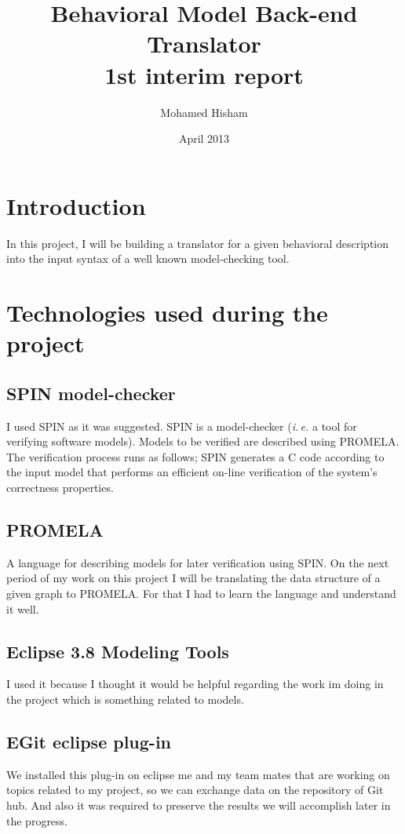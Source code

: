 \documentclass{article}
\title{Behavioral Model Back-end Translator\\ {\smaller 1st interim report}}
\author{Mohamed Hisham}
\date{April 2013}
\begin{document}
\maketitle

\newpage

\tableofcontents

\newpage

\section{Introduction}
In this project, I will be building a translator for a given behavioral description  into the input syntax of a well known model-checking tool. 

\section{Technologies used during the project}

\subsection{SPIN model-checker}
I used SPIN as it was suggested. SPIN is a model-checker (\emph{i.\,e.} a tool for verifying software models). Models to be verified are described using PROMELA. The verification process runs as follows; SPIN generates a C code according to the input model that performs an efficient on-line verification of the system’s correctness properties.

\subsection{PROMELA}
A language for describing models for later verification using SPIN. On the next period of my work on this project I will be translating the data structure of a given graph to PROMELA. For that I had to learn the language and understand it well.

\subsection{Eclipse 3.8 Modeling Tools}
I used it because I thought it would be helpful regarding the work im doing in the project which is something related to models.

\subsection{EGit eclipse plug-in}
We installed this plug-in on eclipse me and my team mates that are working on topics related to my project, so we can exchange data on the repository of Git hub. And also it was required to preserve the results we will accomplish later in the progress.
\end{document}
